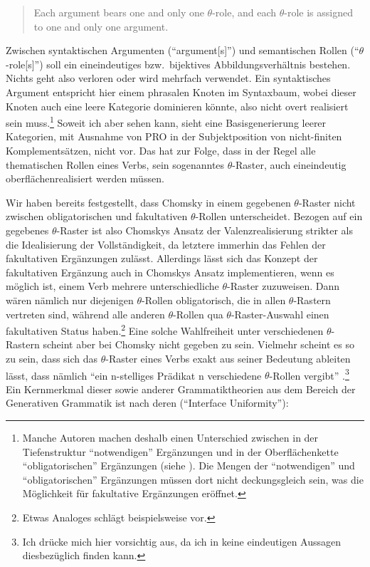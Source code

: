 \begin{quote}
Each argument bears one and only one $\theta$-role, and each $\theta$-role is assigned to one and only one argument. \citep[36]{Chomsky:81}
\end{quote} 
Zwischen syntaktischen Argumenten ("`argument[s]"') und semantischen Rollen ("`$\theta$-role[s]"') soll ein eineindeutiges bzw.\ bijektives Abbildungsverhältnis bestehen. Nichts geht also verloren oder wird mehrfach verwendet. Ein syntaktisches Argument entspricht hier einem phrasalen Knoten im Syntaxbaum, wobei dieser Knoten auch eine leere Kategorie dominieren könnte, also nicht overt realisiert sein muss.\footnote{Manche Autoren machen deshalb einen Unterschied zwischen in der Tiefenstruktur "`notwendigen"' Ergänzungen und in der Oberflächenkette "`obligatorischen"' Ergänzungen (siehe \citealt[100]{Storrer:92}). Die Mengen der "`notwendigen"' und "`obligatorischen"' Ergänzungen müssen dort nicht deckungsgleich sein, was die Möglichkeit für fakultative Ergänzungen eröffnet.} Soweit ich aber sehen kann, sieht \cite{Chomsky:81} eine Basisgenerierung leerer Kategorien, mit Ausnahme von PRO in der Subjektposition von nicht-finiten Komplementsätzen, nicht vor. Das hat zur Folge, dass in der Regel alle thematischen Rollen eines Verbs, sein sogenanntes $\theta$-Raster, auch eineindeutig oberflächenrealisiert werden müssen.

Wir haben bereits festgestellt, dass Chomsky in einem gegebenen $\theta$-Raster nicht zwischen obligatorischen und fakultativen $\theta$-Rollen unterscheidet. Bezogen auf ein gegebenes $\theta$-Raster ist also Chomskys Ansatz der Valenzrealisierung strikter als die Idealisierung der Vollständigkeit, da letztere immerhin das Fehlen der fakultativen Ergänzungen zulässt. Allerdings lässt sich das Konzept der fakultativen Ergänzung auch in Chomskys Ansatz implementieren, wenn es möglich ist, einem Verb mehrere unterschiedliche $\theta$-Raster zuzuweisen. Dann wären nämlich nur diejenigen $\theta$-Rollen obligatorisch, die in allen $\theta$-Rastern vertreten sind, während alle anderen $\theta$-Rollen qua $\theta$-Raster-Auswahl einen fakultativen Status haben.\footnote{Etwas Analoges schlägt beispielsweise \cite{Jacobs:94a} vor.} Eine solche Wahlfreiheit unter verschiedenen $\theta$-Rastern scheint aber bei Chomsky nicht gegeben zu sein. Vielmehr scheint es so zu sein, dass sich das $\theta$-Raster eines Verbs exakt aus seiner Bedeutung ableiten lässt, dass nämlich "`ein n-stelliges Prädikat n verschiedene $\theta$-Rollen vergibt"' \citep[258]{Stechow:Sternefeld:88}.\footnote{Ich drücke mich hier vorsichtig aus, da ich in \cite{Chomsky:81} keine eindeutigen Aussagen diesbezüglich finden kann.} Ein Kernmerkmal dieser sowie anderer Grammatiktheorien aus dem Bereich der Generativen Grammatik ist nach \cite{Culicover:Jackendoff:05} deren  ("`Interface Uniformity"'):

